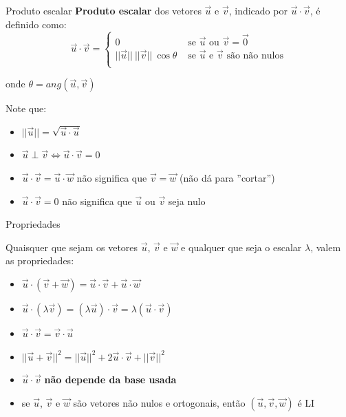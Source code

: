 \begin{frame}{Produto escalar}
    \textbf{Produto escalar} dos vetores \(\vec{u}\) e \(\vec{v}\), indicado por \(\vec{u}\cdot\vec{v}\), é definido como:
    \[
        \vec{u}\cdot\vec{v}=
        \begin{cases}
            0 &\text{ se } \vec{u} \text{ ou } \vec{v} = \vec{0} \\
            ||\vec{u}||~||\vec{v}|| ~\cos{\theta} & \text{ se } \vec{u} \text{ e } \vec{v} \text{ são não nulos}\\
        \end{cases}
    \]

    onde \(\theta = ang(\vec{u},\vec{v})\)

    Note que:
    \begin{itemize}
        \item \(||\vec{u}|| = \sqrt{\vec{u}\cdot\vec{u}}\)
        \item \(\vec{u} \perp \vec{v} \Leftrightarrow \vec{u}\cdot\vec{v}=0\)
        \item \(\vec{u}\cdot\vec{v} = \vec{u}\cdot\vec{w}\) não significa que \(\vec{v}=\vec{w}\) (não dá para ''cortar'')
        \item \(\vec{u}\cdot\vec{v}=0\) não significa que \(\vec{u}\) ou \(\vec{v}\) seja nulo
    \end{itemize}
\end{frame}

\begin{frame}{Propriedades}

    Quaisquer que sejam os vetores \(\vec{u}\), \(\vec{v}\) e \(\vec{w}\) e qualquer que seja o escalar \(\lambda\), valem as propriedades:
    \begin{itemize}
        \item \(\vec{u}\cdot (\vec{v}+\vec{w})=\vec{u}\cdot\vec{v}+\vec{u}\cdot\vec{w}\)
        \item \(\vec{u}\cdot (\lambda\vec{v})=(\lambda\vec{u})\cdot\vec{v}=\lambda (\vec{u}\cdot\vec{v})\)
        \item \(\vec{u}\cdot\vec{v}=\vec{v}\cdot\vec{u}\)
        \item \(||\vec{u}+\vec{v}||^2=||\vec{u}||^2+2\vec{u}\cdot\vec{v}+||\vec{v}||^2\)
        \item \(\vec{u}\cdot\vec{v}\) \textbf{não depende da base usada}
        \item se \(\vec{u}\), \(\vec{v}\) e \(\vec{w}\) são vetores não nulos e ortogonais, então \((\vec{u},\vec{v},\vec{w})\) é LI

    \end{itemize}

\end{frame}

